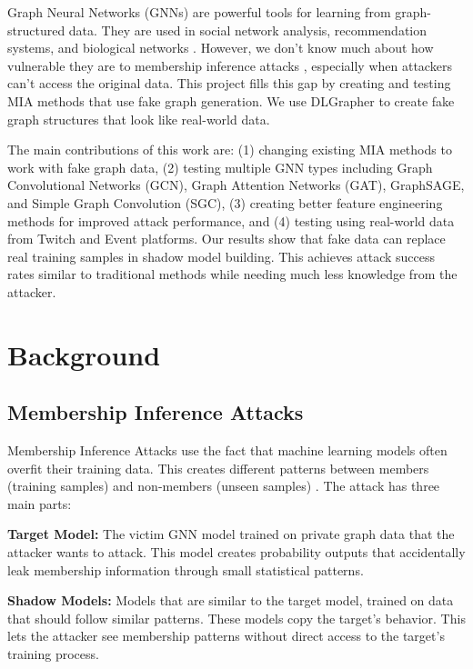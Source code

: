 \documentclass{article}
\begin{document}
Graph Neural Networks (GNNs) are powerful tools for learning from graph-structured data. They are used in social network analysis, recommendation systems, and biological networks \cite{kipf2017semi, velickovic2018graph, hamilton2017inductive}. However, we don't know much about how vulnerable they are to membership inference attacks \cite{he2021membership}, especially when attackers can't access the original data. This project fills this gap by creating and testing MIA methods that use fake graph generation. We use DLGrapher \cite{dlgrapher2022} to create fake graph structures that look like real-world data.

The main contributions of this work are: (1) changing existing MIA methods to work with fake graph data, (2) testing multiple GNN types including Graph Convolutional Networks (GCN), Graph Attention Networks (GAT), GraphSAGE, and Simple Graph Convolution (SGC), (3) creating better feature engineering methods for improved attack performance, and (4) testing using real-world data from Twitch and Event platforms. Our results show that fake data can replace real training samples in shadow model building. This achieves attack success rates similar to traditional methods while needing much less knowledge from the attacker.

\section{Background}
\subsection{Membership Inference Attacks}
Membership Inference Attacks use the fact that machine learning models often overfit their training data. This creates different patterns between members (training samples) and non-members (unseen samples) \cite{salem2019ml, nasr2019comprehensive}. The attack has three main parts:

\textbf{Target Model:} The victim GNN model trained on private graph data that the attacker wants to attack. This model creates probability outputs that accidentally leak membership information through small statistical patterns.

\textbf{Shadow Models:} Models that are similar to the target model, trained on data that should follow similar patterns. These models copy the target's behavior. This lets the attacker see membership patterns without direct access to the target's training process.
\end{document}
